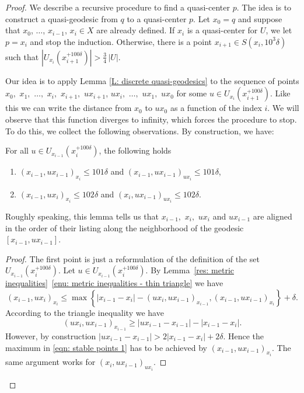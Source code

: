 \begin{proof}
We describe a recursive procedure to find a quasi-center $p$.
The idea is to construct a quasi-geodesic from $q$ to a quasi-center $p$.
Let $x_0=q$ and suppose that $x_0$, $\ldots$, $x_{i-1}$, $x_i\in X$ are already defined.
If $x_i$ is a quasi-center for $U$, we let $p=x_i$ and stop the induction.
Otherwise, there is a point $x_{i+1} \in S(x_i,10^3\delta)$ such that $|U_{x_i}(x_{i+1}^{+ 100 \delta})| > \frac{3}{4}\, |U|$.

Our idea is to apply Lemma \ref{L: discrete quasi-geodesics} to the sequence of points $x_0,$ $x_1,$ $\dots,$ $x_i,$ $x_{i+1},$ $ux_{i+1}$, $ ux_i,$ $\dots,$ $ux_1,$ $ux_0$ for some $u \in U_{x_i}(x_{i+1}^{+ 100 \delta})$. Like this we can write the distance from $x_0$ to $ux_0$ as a function of the index $i$.
We will observe that this function diverges to infinity, which forces the procedure to stop.
To do this, we collect the following observations. By construction, we have:

\begin{lem}\label{L: stable points 1}
For all $u \in U_{x_{i-1}}(x_{i}^{+100\delta})$, the following holds
\begin{enumerate}
\item $(x_{i-1},ux_{i-1})_{x_i}\leqslant 101\delta$ and $(x_{i-1},u{x_{i-1}})_{ux_i}\leqslant 101\delta$,
\item $(x_{i-1},ux_i)_{x_i} \leq 102\delta$ and $(x_i, ux_{i-1})_{ux_i} \leq 102\delta$.
\end{enumerate}
\end{lem}

\begin{rem}
Roughly speaking, this lemma tells us that $x_{i-1},$ $x_i,$ $ux_i$ and $ux_{i-1}$ are aligned in the order of their listing along the neighborhood of the geodesic $[x_{i-1},ux_{i-1}]$.
\end{rem}

\skpt
\begin{proof}
The first point is just a reformulation of the definition of the set~$U_{x_{i-1}}(x_{i}^{+100\delta})$.
Let $u \in U_{x_{i-1}}(x_{i}^{+100\delta})$.
By Lemma~\ref{res: metric inequalities}~\eqref{enu: metric inequalities - thin triangle} we have
\begin{equation}
\label{eqn: stable points 1}
(x_{i-1},ux_i)_{x_i}\leq \max \left\{|x_{i-1}- x_i| - (ux_i, ux_{i-1})_{x_{i-1}}, (x_{i-1},ux_{i-1})_{x_i}\right\} + \delta.
\end{equation}
According to the triangle inequality we have
\begin{equation*}
(ux_i, ux_{i-1})_{x_{i-1}} \geq |ux_{i-1} - x_{i-1}| - |x_{i-1} - x_i|.
\end{equation*}
However, by construction $|ux_{i-1} - x_{i-1}| > 2|x_{i-1} - x_i| + 2\delta$.
Hence the maximum in \eqref{eqn: stable points 1} has to be achieved by $(x_{i-1},ux_{i-1})_{x_i}$.
The same argument works for $(x_i, ux_{i-1})_{ux_i}$.
\end{proof}


\end{proof}
